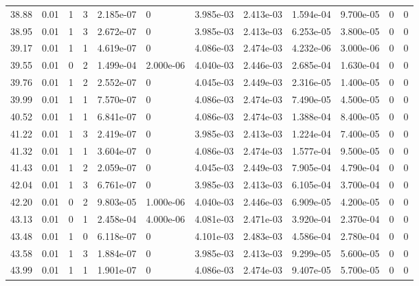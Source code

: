 \documentclass[preview]{standalone}
\begin{document}
{{{\begin{tabular}{L{1.2cm}C{1.2cm} C{0.3cm}C{0.5cm} C{1.4cm}C{1.4cm} C{1.4cm}C{1.4cm} C{1.6cm}C{1.6cm} C{1.6cm}C{1.6cm}}
  38.88  &  0.01  & 1     &  3 &  2.185e-07  & 0  &  3.985e-03&   2.413e-03& 1.594e-04 & 9.700e-05   &  0 & 0  \\ 
  38.95  &  0.01  & 1     &  3 &  2.672e-07  & 0  &  3.985e-03&   2.413e-03& 6.253e-05 & 3.800e-05   &  0 & 0  \\ 
  39.17  &  0.01  & 1     &  1 &  4.619e-07  & 0  &  4.086e-03&   2.474e-03& 4.232e-06 & 3.000e-06   &  0 & 0  \\ 
  39.55  &  0.01  & 0     &  2 &  1.499e-04  & 2.000e-06  &  4.040e-03&   2.446e-03& 2.685e-04 & 1.630e-04   &  0 & 0  \\ 
  39.76  &  0.01  & 1     &  2 &  2.552e-07  & 0  &  4.045e-03&   2.449e-03& 2.316e-05 & 1.400e-05   &  0 & 0  \\ 
  39.99  &  0.01  & 1     &  1 &  7.570e-07  & 0  &  4.086e-03&   2.474e-03& 7.490e-05 & 4.500e-05   &  0 & 0  \\ 
  40.52  &  0.01  & 1     &  1 &  6.841e-07  & 0  &  4.086e-03&   2.474e-03& 1.388e-04 & 8.400e-05   &  0 & 0  \\ 
  41.22  &  0.01  & 1     &  3 &  2.419e-07  & 0  &  3.985e-03&   2.413e-03& 1.224e-04 & 7.400e-05   &  0 & 0  \\ 
  41.32  &  0.01  & 1     &  1 &  3.604e-07  & 0  &  4.086e-03&   2.474e-03& 1.577e-04 & 9.500e-05   &  0 & 0  \\ 
  41.43  &  0.01  & 1     &  2 &  2.059e-07  & 0  &  4.045e-03&   2.449e-03& 7.905e-04 & 4.790e-04   &  0 & 0  \\ 
  42.04  &  0.01  & 1     &  3 &  6.761e-07  & 0  &  3.985e-03&   2.413e-03& 6.105e-04 & 3.700e-04   &  0 & 0  \\ 
  42.20  &  0.01  & 0     &  2 &  9.803e-05  & 1.000e-06  &  4.040e-03&   2.446e-03& 6.909e-05 & 4.200e-05   &  0 & 0  \\ 
  43.13  &  0.01  & 0     &  1 &  2.458e-04  & 4.000e-06  &  4.081e-03&   2.471e-03& 3.920e-04 & 2.370e-04   &  0 & 0  \\ 
  43.48  &  0.01  & 1     &  0 &  6.118e-07  & 0  &  4.101e-03&   2.483e-03& 4.586e-04 & 2.780e-04   &  0 & 0  \\ 
  43.58  &  0.01  & 1     &  3 &  1.884e-07  & 0  &  3.985e-03&   2.413e-03& 9.299e-05 & 5.600e-05   &  0 & 0  \\ 
  43.99  &  0.01  & 1     &  1 &  1.901e-07  & 0  &  4.086e-03&   2.474e-03& 9.407e-05 & 5.700e-05   &  0 & 0  \\ 
\hline 
\end{tabular} 

}}}
\end{document}

